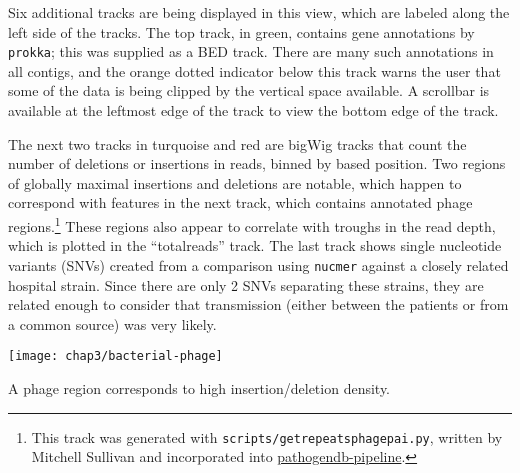 Six additional tracks are being displayed in this view, which are labeled along the left side of the tracks. The top track, in green, contains gene annotations by \texttt{prokka};\autocite{Seemann2014} this was supplied as a BED track. There are many such annotations in all contigs, and the orange dotted indicator below this track warns the user that some of the data is being clipped by the vertical space available. A scrollbar is available at the leftmost edge of the track to view the bottom edge of the track. 

The next two tracks in turquoise and red are bigWig tracks that count the number of deletions or insertions in reads, binned by based position. Two regions of globally maximal insertions and deletions are notable, which happen to correspond with features in the next track, which contains annotated phage regions.\footnote{This track was generated with \texttt{scripts/get\textunderscore repeats\textunderscore phage\textunderscore pai.py}, written by Mitchell Sullivan and incorporated into \href{https://github.com/powerpak/pathogendb-pipeline}{pathogendb-pipeline}.} These regions also appear to correlate with troughs in the read depth, which is plotted in the ``total\textunderscore reads'' track. The last track shows single nucleotide variants (SNVs) created from a comparison using \texttt{nucmer} against a closely related hospital strain. Since there are only 2 SNVs separating these strains, they are related enough to consider that transmission (either between the patients or from a common source) was very likely.

\begin{marginfigure}
  \texttt{[image: chap3/bacterial-phage]}               
  \caption[A phage region corresponds to high insertion/deletion density.]{A phage region corresponds to high insertion/deletion density.}
  \label{fig:bacterial_phage}
\end{marginfigure}

